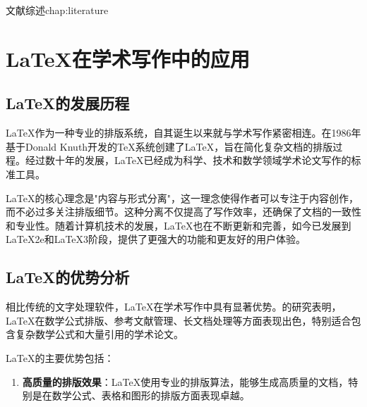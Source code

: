 \begin{cuzchapter}{文献综述}{chap:literature}


	\section{LaTeX在学术写作中的应用}\label{sec:latex-academic}
	
	\subsection{LaTeX的发展历程}
	
	\LaTeX{}作为一种专业的排版系统，自其诞生以来就与学术写作紧密相连。\citet{lamport1986document}在1986年基于Donald Knuth开发的\TeX{}系统创建了\LaTeX{}，旨在简化复杂文档的排版过程。经过数十年的发展，\LaTeX{}已经成为科学、技术和数学领域学术论文写作的标准工具。
	
	\LaTeX{}的核心理念是"内容与形式分离"，这一理念使得作者可以专注于内容创作，而不必过多关注排版细节。这种分离不仅提高了写作效率，还确保了文档的一致性和专业性。随着计算机技术的发展，\LaTeX{}也在不断更新和完善，如今已发展到\LaTeX2e和\LaTeX3阶段，提供了更强大的功能和更友好的用户体验。
	
	\subsection{LaTeX的优势分析}
	
	相比传统的文字处理软件，\LaTeX{}在学术写作中具有显著优势。\citet{stamerjohanns2009mathml}的研究表明，\LaTeX{}在数学公式排版、参考文献管理、长文档处理等方面表现出色，特别适合包含复杂数学公式和大量引用的学术论文。
	
	\LaTeX{}的主要优势包括：
	
	\begin{enumerate}
		\item \textbf{高质量的排版效果}：\LaTeX{}使用专业的排版算法，能够生成高质量的文档，特别是在数学公式、表格和图形的排版方面表现卓越。
		

\end{enumerate}
\end{cuzchapter}
